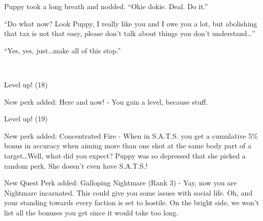 Puppy took a long breath and nodded. ``Okie dokie. Deal. Do it.''


``Do what now? Look Puppy, I really like you and I owe you a lot, but abolishing that tax is not that easy, please don't talk about things you don't understand\dots''

``Yes, yes, just\dots make all of this stop.''


\clearpage

~\vfill

\begin{engnote}
		Level up! (18)
	
		New perk added: Here and now! - You gain a level, because stuff.
\end{engnote}

\begin{engnote}
		Level up! (19)
	
		New perk added: Concentrated Fire - When in S.A.T.S. you get a cumulative 5\% bonus in accuracy when aiming more than one shot at the same body part of a target\dots Well, what did you expect? Puppy was so depressed that she picked a random perk. She doesn't even have S.A.T.S.!
	
		New Quest Perk added: Galloping Nightmare (Rank 3) - Yay, now you are Nightmare incarnated. This could give you some issues with social life. Oh, and your standing towards every faction is set to hostile. On the bright side, we won't list all the bonuses you get since it would take too long.	
\end{engnote}


